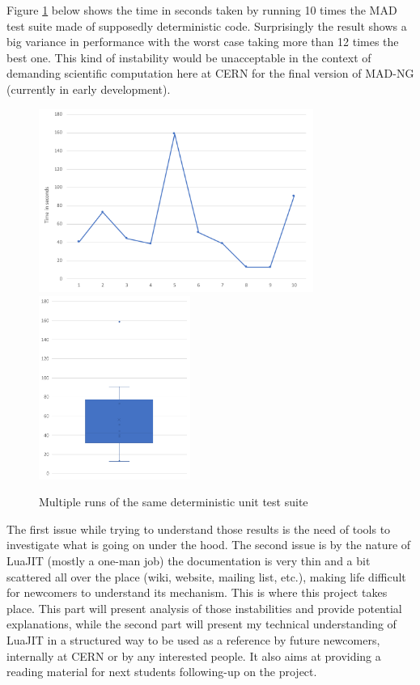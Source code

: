
Figure \ref{fig:pb-statement} below shows the time in seconds taken by running 10
times the MAD test suite made of supposedly deterministic code. Surprisingly the
result shows a big variance in performance with the worst case taking more than
12 times the best one. This kind of instability would be unacceptable in the
context of demanding scientific computation here at CERN for the final version
of MAD-NG (currently in early development).

\begin{figure}[H]
    \centering
	\includegraphics[height=6cm]{./Images/pb-statement-curve.pdf}
	\includegraphics[height=6cm]{./Images/pb-statement-box.pdf}
    \caption{Multiple runs of the same deterministic unit test suite}
    \label{fig:pb-statement}
\end{figure}

The first issue while trying to understand those results is the need of tools
to investigate what is going on under the hood. The second issue is by the
nature of LuaJIT (mostly a one-man job) the documentation is very thin and a bit
scattered all over the place (wiki, website, mailing list, etc.), making life
difficult for newcomers to understand its mechanism.
This is where this project takes place. This part will present analysis of those
instabilities and provide potential explanations, while the second part
will present my technical understanding of LuaJIT in a structured way
to be used as a reference by future newcomers, internally at CERN or by any
interested people. It also aims at providing a reading material for next
students following-up on the project.

